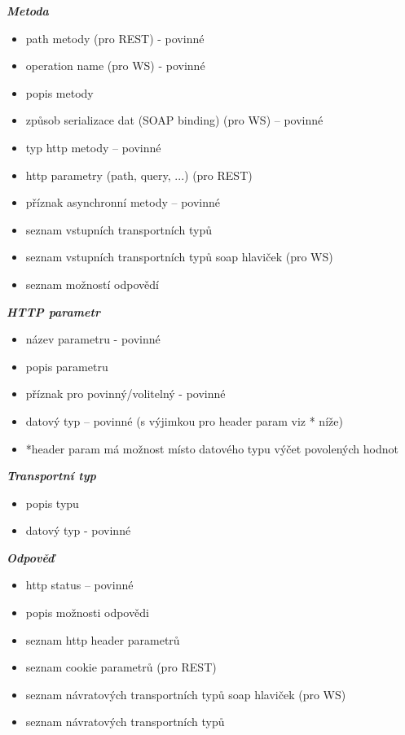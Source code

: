 \documentclass[11pt,twoside,a4paper]{book}
\begin{document}
\textbf{\textit{Metoda}}

\begin{itemize}
  \item path metody (pro REST) - povinné
  \item operation name (pro WS) - povinné
  \item popis metody
  \item způsob serializace dat (SOAP binding) (pro WS) – povinné
  \item typ http metody – povinné
  \item http parametry (path, query, ...) (pro REST)
  \item příznak asynchronní metody – povinné
  \item seznam vstupních transportních typů
  \item seznam vstupních transportních typů soap hlaviček (pro WS)
  \item seznam možností odpovědí
\end{itemize}

\textbf{\textit{HTTP parametr}}

\begin{itemize}
  \item název parametru - povinné
  \item popis parametru
  \item příznak pro povinný/volitelný - povinné
  \item datový typ – povinné (s výjimkou pro header param viz * níže)
  \item *header param má možnost místo datového typu výčet
povolených hodnot
\end{itemize}

\textbf{\textit{Transportní typ}}

\begin{itemize}
  \item popis typu
  \item datový typ - povinné
\end{itemize}

\textbf{\textit{Odpověď}}

\begin{itemize}
  \item http status – povinné
  \item popis možnosti odpovědi
  \item seznam http header parametrů
  \item seznam cookie parametrů (pro REST)
  \item seznam návratových transportních typů soap hlaviček (pro WS)
  \item seznam návratových transportních typů
\end{itemize}
\end{document}
